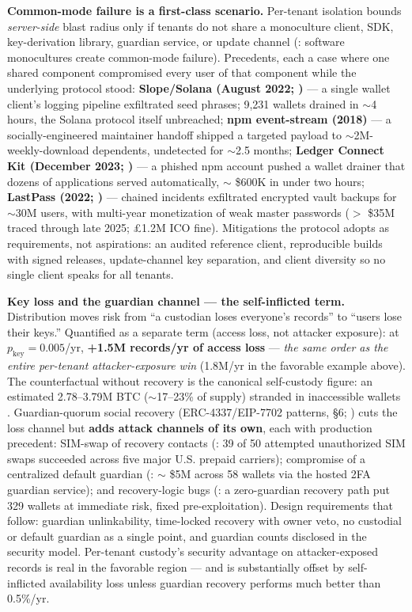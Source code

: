 \documentclass[
]{article}
\begin{document}
\textbf{Common-mode failure is a first-class scenario.} Per-tenant
isolation bounds \emph{server-side} blast radius only if tenants do not
share a monoculture client, SDK, key-derivation library, guardian
service, or update channel (: software monocultures create common-mode
failure). Precedents, each a case where one shared component compromised
every user of that component while the underlying protocol stood:
\textbf{Slope/Solana (August 2022; )} --- a single wallet client's
logging pipeline exfiltrated seed phrases; 9,231 wallets drained in
\(\sim\)4 hours, the Solana protocol itself unbreached; \textbf{npm
event-stream (2018)} --- a socially-engineered maintainer handoff
shipped a targeted payload to \(\sim\)2M-weekly-download dependents,
undetected for \(\sim\)2.5 months; \textbf{Ledger Connect Kit (December
2023; )} --- a phished npm account pushed a wallet drainer that dozens
of applications served automatically, \(\sim\) \$600K in under two
hours; \textbf{LastPass (2022; )} --- chained incidents exfiltrated
encrypted vault backups for \(\sim\)30M users, with multi-year
monetization of weak master passwords (\(>\) \$35M traced through late
2025; £1.2M ICO fine). Mitigations the protocol adopts as requirements,
not aspirations: an audited reference client, reproducible builds with
signed releases, update-channel key separation, and client diversity so
no single client speaks for all tenants.

\textbf{Key loss and the guardian channel --- the self-inflicted term.}
Distribution moves risk from ``a custodian loses everyone's records'' to
``users lose their keys.'' Quantified as a separate term (access loss,
not attacker exposure): at \(p_{\mathrm{key}} = 0.005\)/yr,
\textbf{+1.5M records/yr of access loss} --- \emph{the same order as the
entire per-tenant attacker-exposure win} (1.8M/yr in the favorable
example above). The counterfactual without recovery is the canonical
self-custody figure: an estimated 2.78--3.79M BTC (\(\sim\)17--23\% of
supply) stranded in inaccessible wallets . Guardian-quorum social
recovery (ERC-4337/EIP-7702 patterns, §6; ) cuts the loss channel but
\textbf{adds attack channels of its own}, each with production
precedent: SIM-swap of recovery contacts (: 39 of 50 attempted
unauthorized SIM swaps succeeded across five major U.S. prepaid
carriers); compromise of a centralized default guardian (: \(\sim\) \$5M
across 58 wallets via the hosted 2FA guardian service); and
recovery-logic bugs (: a zero-guardian recovery path put 329 wallets at
immediate risk, fixed pre-exploitation). Design requirements that
follow: guardian unlinkability, time-locked recovery with owner veto, no
custodial or default guardian as a single point, and guardian counts
disclosed in the security model. Per-tenant custody's security advantage
on attacker-exposed records is real in the favorable region --- and is
substantially offset by self-inflicted availability loss unless guardian
recovery performs much better than 0.5\%/yr.
\end{document}
